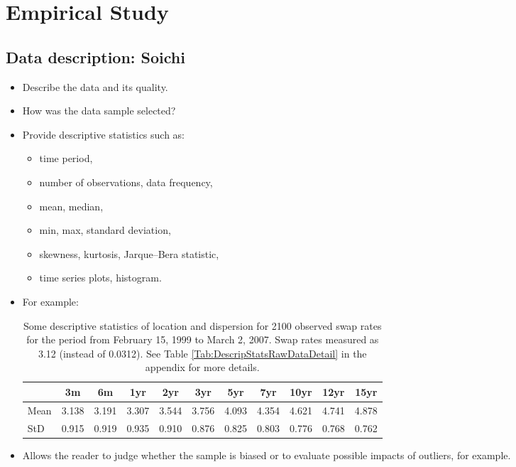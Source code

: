 \section{Empirical Study}\label{Sec:empirical}
\subsection{Data description: Soichi}
\begin{itemize}
	\item Describe the data and its quality.
	\item How was the data sample selected?
	\item Provide descriptive statistics such as:
	\begin{itemize}
		\item time period,
		\item number of observations, data frequency,
		\item mean, median,
		\item min, max, standard deviation,
		\item skewness, kurtosis, Jarque--Bera statistic,
		\item time series plots, histogram.
	\end{itemize}
	\item For example:
	\begin{table}[ht]
		
		\begin{center}
			{\footnotesize
				\begin{tabular}{l|cccccccccc}
					\hline \hline
					& 3m    & 6m    & 1yr   & 2yr   & 3yr   & 5yr   & 7yr   & 10yr  & 12yr  & 15yr   \\
					\hline
					Mean   & 3.138 & 3.191 & 3.307 & 3.544 & 3.756 & 4.093 & 4.354 & 4.621 & 4.741 & 4.878  \\
					StD    & 0.915 & 0.919 & 0.935 & 0.910 & 0.876 & 0.825 & 0.803 & 0.776 & 0.768 & 0.762  \\
					\hline \hline
				\end{tabular}}
			\end{center}
			\caption{Some descriptive statistics of location and dispersion for
				2100 observed swap rates for the period from February 15, 1999
				to March 2, 2007. Swap rates measured as 3.12 (instead of 0.0312). See Table
				\ref{Tab:DescripStatsRawDataDetail} in the appendix for
				more details.}
			\label{Tab:DescripStatsRawData}
		\end{table}
		
		\item Allows the reader to judge whether the sample is biased or to evaluate possible impacts of outliers, for
		example.
		
	\end{itemize}
